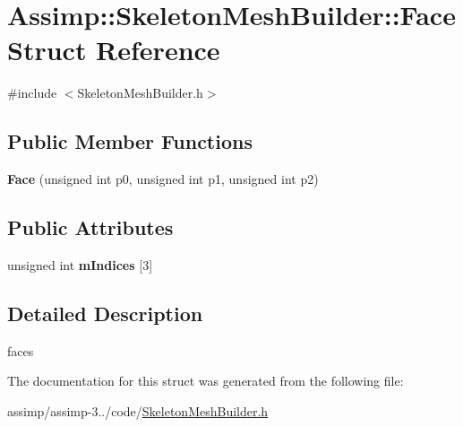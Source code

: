 \hypertarget{struct_assimp_1_1_skeleton_mesh_builder_1_1_face}{\section{Assimp\+:\+:Skeleton\+Mesh\+Builder\+:\+:Face Struct Reference}
\label{struct_assimp_1_1_skeleton_mesh_builder_1_1_face}
}


{\ttfamily \#include $<$Skeleton\+Mesh\+Builder.\+h$>$}

\subsection*{Public Member Functions}
\begin{DoxyCompactItemize}
\item 
\hypertarget{struct_assimp_1_1_skeleton_mesh_builder_1_1_face_a7fc75208520cf77334eef02bc3d437f1}{{\bfseries Face} (unsigned int p0, unsigned int p1, unsigned int p2)}\label{struct_assimp_1_1_skeleton_mesh_builder_1_1_face_a7fc75208520cf77334eef02bc3d437f1}

\end{DoxyCompactItemize}
\subsection*{Public Attributes}
\begin{DoxyCompactItemize}
\item 
\hypertarget{struct_assimp_1_1_skeleton_mesh_builder_1_1_face_a2e38536f110748db8a32bd7e995a8bdb}{unsigned int {\bfseries m\+Indices} \mbox{[}3\mbox{]}}\label{struct_assimp_1_1_skeleton_mesh_builder_1_1_face_a2e38536f110748db8a32bd7e995a8bdb}

\end{DoxyCompactItemize}


\subsection{Detailed Description}
faces 

The documentation for this struct was generated from the following file\+:\begin{DoxyCompactItemize}
\item 
assimp/assimp-\/3../code/\hyperlink{_skeleton_mesh_builder_8h}{Skeleton\+Mesh\+Builder.\+h}\end{DoxyCompactItemize}
